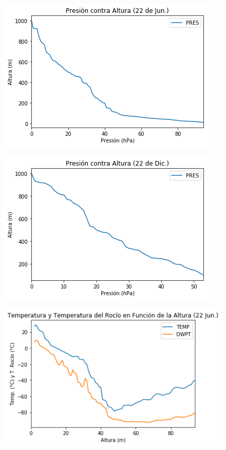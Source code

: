 \documentclass{article}
\begin{document}
    \begin{figure}[H]
        \centering
        \includegraphics[width=\linewidth]{paj.png}
    \end{figure}
    \begin{figure}[H]
        \centering
        \includegraphics[width=\linewidth]{pad.png}
    \end{figure}
    \begin{figure}[H]
        \centering
        \includegraphics[width=\linewidth]{ttrj.png}
    \end{figure}
\end{document}
